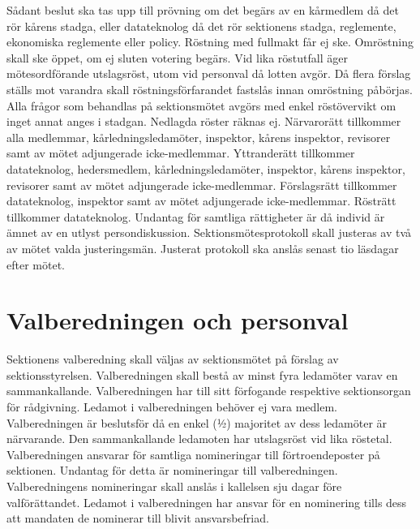 \documentclass[a4paper]{dteklag}
\begin{document}
\stycke Sådant beslut ska tas upp till prövning om det begärs av en kårmedlem då det rör kårens stadga, eller datateknolog då det rör sektionens stadga, reglemente, ekonomiska reglemente eller policy.
\para[Omröstning] Röstning med fullmakt får ej ske.
\para Omröstning skall ske öppet, om ej sluten votering begärs.
\para Vid lika röstutfall äger mötesordförande utslagsröst, utom vid personval då lotten avgör.
\para Då flera förslag ställs mot varandra skall röstningsförfarandet fastslås innan omröstning påbörjas.
\para Alla frågor som behandlas på sektionsmötet avgörs med enkel röstövervikt om inget annat anges i stadgan. Nedlagda röster räknas ej.
\para[Rättigheter] Närvarorätt tillkommer alla medlemmar, kårledningsledamöter, inspektor, kårens inspektor, revisorer samt av mötet adjungerade icke-medlemmar.
\para Yttranderätt tillkommer datateknolog, hedersmedlem, kårledningsledamöter, inspektor, kårens inspektor, revisorer samt av mötet adjungerade icke-medlemmar.
\para Förslagsrätt tillkommer datateknolog, inspektor samt av mötet adjungerade icke-medlemmar.
\para Rösträtt tillkommer datateknolog.
\para[Persondiskussion] Undantag för samtliga rättigheter är då individ är ämnet av en utlyst persondiskussion. 
\para[Protokoll] Sektionsmötesprotokoll skall justeras av två av mötet valda justeringsmän. Justerat protokoll ska anslås senast tio läsdagar efter mötet.

\section{Valberedningen och personval}
\para[Sammansättning] Sektionens valberedning skall väljas av sektionsmötet på förslag av sektionsstyrelsen.
\para Valberedningen skall bestå av minst fyra ledamöter varav en sammankallande.
\para Valberedningen har till sitt förfogande respektive sektionsorgan för rådgivning.
\para Ledamot i valberedningen behöver ej vara medlem.
\para[Beslutsförhet] Valberedningen är beslutsför då en enkel (1⁄2) majoritet av dess ledamöter är närvarande.
\para Den sammankallande ledamoten har utslagsröst vid lika röstetal.
\para[Åligganden] Valberedningen ansvarar för samtliga nomineringar till förtroendeposter på sektionen.
\stycke Undantag för detta är nomineringar till valberedningen.
\para Valberedningens nomineringar skall anslås i kallelsen sju dagar före valförättandet.
\para Ledamot i valberedningen har ansvar för en nominering tills dess att mandaten de nominerar till blivit ansvarsbefriad. 
\end{document}
